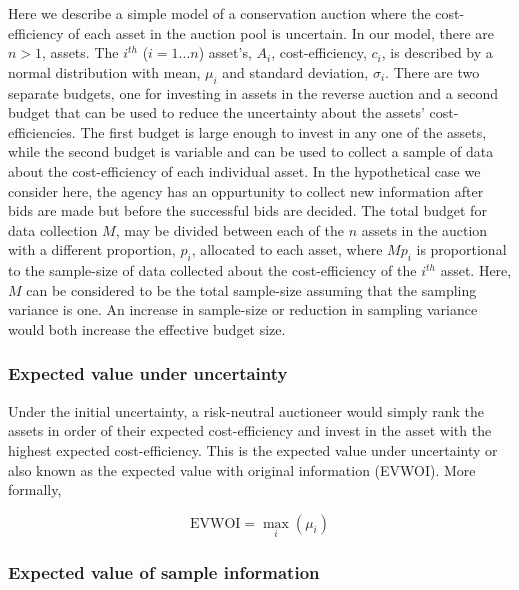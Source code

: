 \documentclass[]{article}
\theoremstyle{definition}
\theoremstyle{definition}
\theoremstyle{remark}
\begin{document}
Here we describe a simple model of a conservation auction where the
cost-efficiency of each asset in the auction pool is uncertain. In our
model, there are \(n>1\), assets. The \(i^{th}\) (\(i = 1...n\))
asset's, \(A_i\), cost-efficiency, \(c_i\), is described by a normal
distribution with mean, \(\mu_i\) and standard deviation, \(\sigma_i\).
There are two separate budgets, one for investing in assets in the
reverse auction and a second budget that can be used to reduce the
uncertainty about the assets' cost-efficiencies. The first budget is
large enough to invest in any one of the assets, while the second budget
is variable and can be used to collect a sample of data about the
cost-efficiency of each individual asset. In the hypothetical case we
consider here, the agency has an oppurtunity to collect new information
after bids are made but before the successful bids are decided. The
total budget for data collection \(M\), may be divided between each of
the \(n\) assets in the auction with a different proportion, \(p_i\),
allocated to each asset, where \(Mp_i\) is proportional to the
sample-size of data collected about the cost-efficiency of the
\(i^{th}\) asset. Here, \(M\) can be considered to be the total
sample-size assuming that the sampling variance is one. An increase in
sample-size or reduction in sampling variance would both increase the
effective budget size.

\subsubsection*{Expected value under
uncertainty}\label{expected-value-under-uncertainty}

Under the initial uncertainty, a risk-neutral auctioneer would simply
rank the assets in order of their expected cost-efficiency and invest in
the asset with the highest expected cost-efficiency. This is the
expected value under uncertainty or also known as the expected value
with original information (EVWOI). More formally,

\begin{equation}
\mathrm{EVWOI} = \max_i(\mu_i)
\label{eq:EVWOIan}
\end{equation}

\subsubsection*{Expected value of sample
information}\label{expected-value-of-sample-information}
\end{document}
